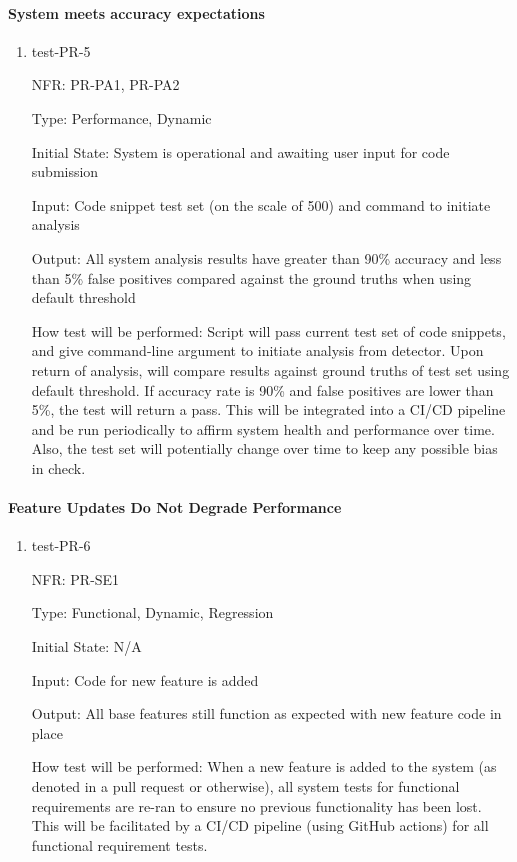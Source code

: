 \documentclass[12pt, titlepage]{article}
\begin{document}
\paragraph{System meets accuracy expectations}
\begin{enumerate}
  \item{test-PR-5}

  NFR: PR-PA1, PR-PA2

  Type: Performance, Dynamic
            
  Initial State: System is operational and awaiting user input for code submission
            
  Input: Code snippet test set (on the scale of 500) and command to initiate analysis
            
  Output: All system analysis results have greater than 90\% accuracy and less than 5\%
  false positives compared against the ground truths when using default threshold
            
  How test will be performed: 
  Script will pass current test set of code snippets, 
  and give command-line argument to initiate analysis from detector. Upon return 
  of analysis, will compare results against ground truths of test set using default
  threshold. If accuracy rate is 90\% and false positives are lower than 5\%, the test
   will return a pass. This will be integrated into a CI/CD pipeline and be run periodically
  to affirm system health and performance over time. Also, the test set will potentially
  change over time to keep any possible bias in check.
\end{enumerate}

\paragraph{Feature Updates Do Not Degrade Performance}
\begin{enumerate}
  \item{test-PR-6}

  NFR: PR-SE1

  Type: Functional, Dynamic, Regression
            
  Initial State: N/A
            
  Input: Code for new feature is added 
            
  Output: All base features still function as expected with new feature code in place
            
  How test will be performed: When a new feature is added to the system (as denoted in a 
  pull request or otherwise), all system tests for functional requirements
  are re-ran to ensure no previous functionality has been lost. This will be facilitated
  by a CI/CD pipeline (using GitHub actions) for all functional requirement tests.
\end{enumerate}
\end{document}
